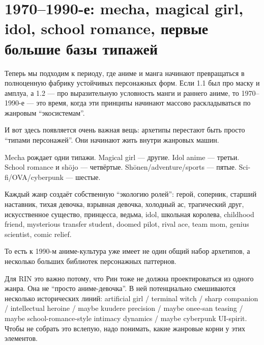 \section{1970–1990-е: mecha, magical girl, idol, school romance, первые большие базы типажей}

Теперь мы подходим к периоду, где аниме и манга начинают превращаться в
полноценную фабрику устойчивых персонажных форм. Если 1.1 был про маску
и амплуа, а 1.2 --- про выразительную условность манги и раннего аниме,
то 1970--1990-е --- это время, когда эти принципы начинают массово
раскладываться по жанровым ``экосистемам''.

И вот здесь появляется очень важная вещь: архетипы перестают быть просто
``типами персонажей''. Они начинают жить внутри жанровых машин.

Mecha рождает одни типажи. Magical girl --- другие. Idol anime ---
третьи. School romance и shōjo --- четвёртые. Shōnen/\hspace{0pt}adventure/\hspace{0pt}sports
--- пятые. Sci-fi/\hspace{0pt}OVA/\hspace{0pt}cyberpunk --- шестые.

Каждый жанр создаёт собственную ``экологию ролей'': герой, соперник,
старший наставник, тихая девочка, взрывная девочка, холодный ас,
трагический друг, искусственное существо, принцесса, ведьма, idol,
школьная королева, childhood friend, mysterious transfer student, doomed
pilot, rival ace, team mom, genius scientist, comic relief.

То есть к 1990-м аниме-культура уже имеет не один общий набор архетипов,
а несколько больших библиотек персонажных паттернов.

Для RIN это важно потому, что Рин тоже не должна проектироваться из
одного жанра. Она не ``просто аниме-девочка''. В ней потенциально
смешиваются несколько исторических линий: artificial girl /\hspace{0pt} terminal
witch /\hspace{0pt} sharp companion /\hspace{0pt} intellectual heroine /\hspace{0pt} maybe kuudere precision
/\hspace{0pt} maybe onee-san teasing /\hspace{0pt} maybe school-romance-style intimacy dynamics
/\hspace{0pt} maybe cyberpunk UI-spirit. Чтобы не собрать это вслепую, надо
понимать, какие жанровые корни у этих элементов.


